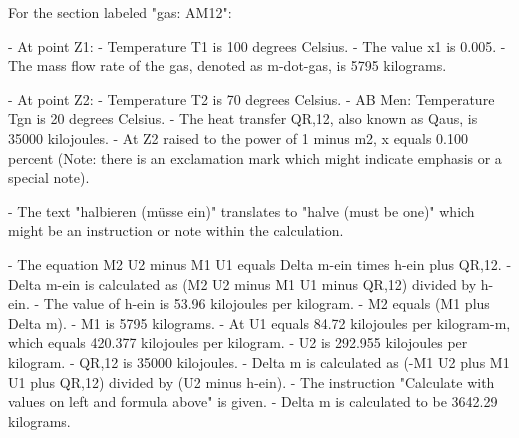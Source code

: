 For the section labeled "gas: AM12":

- At point Z1:
  - Temperature T1 is 100 degrees Celsius.
  - The value x1 is 0.005.
  - The mass flow rate of the gas, denoted as m-dot-gas, is 5795 kilograms.

- At point Z2:
  - Temperature T2 is 70 degrees Celsius.
  - AB Men: Temperature Tgn is 20 degrees Celsius.
  - The heat transfer QR,12, also known as Qaus, is 35000 kilojoules.
  - At Z2 raised to the power of 1 minus m2, x equals 0.100 percent (Note: there is an exclamation mark which might indicate emphasis or a special note).

- The text "halbieren (müsse ein)" translates to "halve (must be one)" which might be an instruction or note within the calculation.
  
- The equation M2 U2 minus M1 U1 equals Delta m-ein times h-ein plus QR,12.
- Delta m-ein is calculated as (M2 U2 minus M1 U1 minus QR,12) divided by h-ein.
- The value of h-ein is 53.96 kilojoules per kilogram.
- M2 equals (M1 plus Delta m).
- M1 is 5795 kilograms.
- At U1 equals 84.72 kilojoules per kilogram-m, which equals 420.377 kilojoules per kilogram.
- U2 is 292.955 kilojoules per kilogram.
- QR,12 is 35000 kilojoules.
- Delta m is calculated as (-M1 U2 plus M1 U1 plus QR,12) divided by (U2 minus h-ein).
- The instruction "Calculate with values on left and formula above" is given.
- Delta m is calculated to be 3642.29 kilograms.